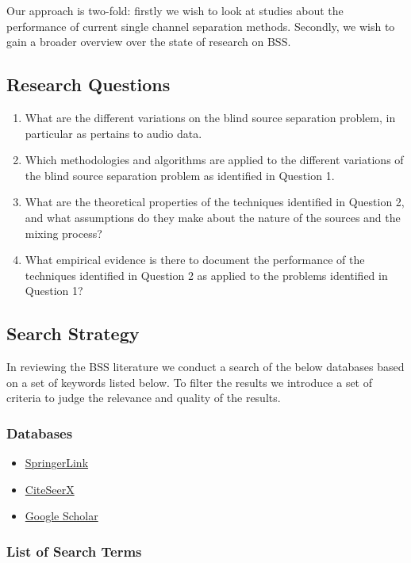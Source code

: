 \documentclass[11pt, oneside, a4paper]{report}
\begin{document}
Our approach is two-fold: firstly we wish to look at studies about the performance of current single channel separation methods. Secondly, we wish to gain a broader overview over the state of research on BSS.

\subsection{Research Questions}
\begin{enumerate}
  \item What are the different variations on the blind source
    separation problem, in particular as pertains to audio data.
  \item Which methodologies and algorithms are applied to the
    different variations of the blind source separation problem as identified in Question 1.
  \item What are the theoretical properties of the techniques
    identified in Question 2, and  what assumptions do they make about the nature of the sources and the mixing process?
  \item What empirical evidence is there to document the performance
    of the techniques identified in Question 2 as applied to the
    problems identified in Question 1?
\end{enumerate}



\subsection{Search Strategy}
In reviewing the BSS literature we conduct a search of the below databases based on a set of keywords listed below. To filter the results we introduce a set of criteria to judge the relevance and quality of the results.

\subsubsection{Databases}

\begin{itemize}
 \item \href{www.springerlink.com}{SpringerLink}
 \item \href {www.citeseerx}{CiteSeerX}
 \item \href{scholar.google.com}{Google Scholar}
\end{itemize}

\subsubsection{List of Search Terms}
\end{document}
